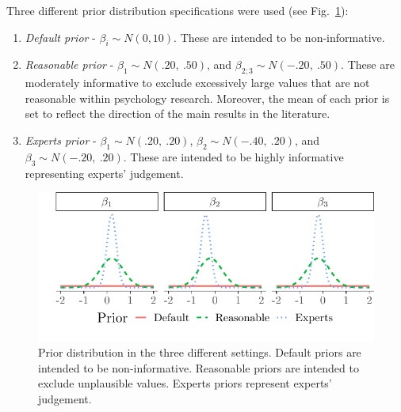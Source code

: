 \documentclass[graybox]{svmult}
\begin{document}
Three different prior distribution specifications were used (see Fig.~\ref{fig:prior}):
\begin{enumerate}
	\item{\textit{Default prior} - $\beta_i \sim N(0,10)$}. These are intended to be non-informative.
	\item{\textit{Reasonable prior} - $\beta_1\sim N(.20,\ .50)$, and  $\beta_{2;3}\sim N(-.20,\ .50)$. These are moderately informative to exclude excessively large values that are not reasonable within psychology research. Moreover, the mean of each prior is set to reflect the direction of the main results in the literature.}
 	\item{\textit{Experts prior} - $\beta_1\sim N(.20,\ .20)$,  $\beta_{2}\sim N(-.40,\ .20)$}, and $\beta_3\sim N(-.20,\ .20)$. These are intended to be highly informative representing experts' judgement. %
\end{enumerate}
\begin{figure}[b]
	\sidecaption
	\includegraphics[width = .55\textwidth]{figure/Plot_prior}
	\caption{Prior distribution in the three different settings. Default priors are intended to be non-informative. Reasonable priors  are intended to exclude unplausible values. Experts priors represent experts' judgement.}
	\label{fig:prior}
\end{figure}
\end{document}

